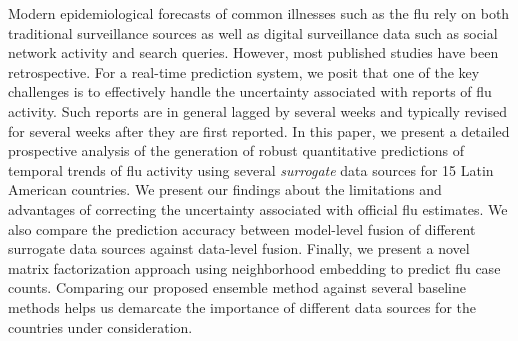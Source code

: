 Modern epidemiological forecasts of
common illnesses such as the flu rely on both traditional surveillance
sources as well as digital surveillance data such as social network
activity and search queries. 
However, most published
studies have been retrospective. For a real-time prediction system,
we posit that one of the key challenges is to effectively handle the uncertainty
associated with reports of flu activity.
Such reports are in general lagged by several weeks and typically revised
for several weeks after they are first reported. In this paper, 
we present a detailed
prospective analysis of the generation of robust quantitative predictions 
of temporal trends of flu activity using several {\it surrogate} data 
sources for 15 Latin American countries.
We present our findings about the limitations and
advantages of correcting the uncertainty associated with official 
flu estimates. We 
also compare the prediction accuracy between model-level fusion 
of different surrogate data sources
against data-level fusion. Finally, we present a novel matrix factorization 
approach using neighborhood embedding to predict flu case counts. 
Comparing our proposed ensemble method against several baseline
methods helps us demarcate the importance of different data
sources for the countries under consideration.
